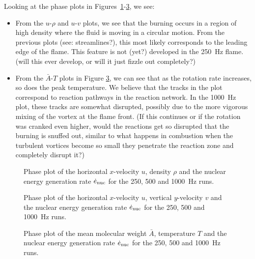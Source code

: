 \documentclass[preprint,times,tighten]{aastex63}
\begin{document}

Looking at the phase plots in Figures~\ref{fig:urho}-\ref{fig:abar}, we see:
\begin{itemize}
    \item From the $u$-$\rho$ and $u$-$v$ plots, we see that the burning occurs in a region of high density where the fluid is moving in a circular motion. From the previous plots (see: streamlines?), this most likely corresponds to the leading edge of the flame. This feature is not (yet?) developed in the 250~Hz flame. (will this ever develop, or will it just fizzle out completely?)
    \item From the $\bar{A}$-$T$ plots in Figure \ref{fig:abar}, we can see that as the rotation rate increases, so does the peak temperature. We believe that the tracks in the plot correspond to reaction pathways in the reaction network. In the 1000~Hz plot, these tracks are somewhat disrupted, possibly due to the more vigorous mixing of the vortex at the flame front. (If this continues or if the rotation was cranked even higher, would the reactions get so disrupted that the burning is snuffed out, similar to what happens in combustion when the turbulent vortices become so small they penetrate the reaction zone and completely disrupt it?)
\end{itemize}

\begin{figure}[t]
    \centering
    \caption{\label{fig:urho}Phase plot of the horizontal $x$-velocity $u$, density $\rho$ and the nuclear energy generation rate $\dot{e}_{\rm nuc}$ for the 250, 500 and 1000~Hz runs.}
\end{figure}

\begin{figure}[t]
    \centering
    \caption{\label{fig:uv}Phase plot of the horizontal $x$-velocity $u$, vertical $y$-velocity $v$ and the nuclear energy generation rate $\dot{e}_{\rm nuc}$ for the 250, 500 and 1000~Hz runs.}
\end{figure}

\begin{figure}[t]
    \centering
    \caption{\label{fig:abar}Phase plot of the mean molecular weight $\bar{A}$, temperature $T$ and the nuclear energy generation rate $\dot{e}_{\rm nuc}$ for the 250, 500 and 1000~Hz runs.}
\end{figure}
    
\end{document}
